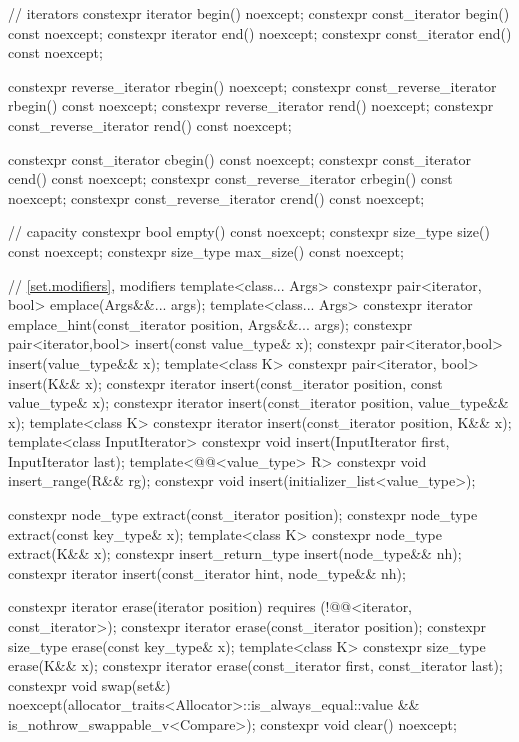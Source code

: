 \begin{codeblock}
{{    // iterators
    constexpr iterator               begin() noexcept;
    constexpr const_iterator         begin() const noexcept;
    constexpr iterator               end() noexcept;
    constexpr const_iterator         end() const noexcept;

    constexpr reverse_iterator       rbegin() noexcept;
    constexpr const_reverse_iterator rbegin() const noexcept;
    constexpr reverse_iterator       rend() noexcept;
    constexpr const_reverse_iterator rend() const noexcept;

    constexpr const_iterator         cbegin() const noexcept;
    constexpr const_iterator         cend() const noexcept;
    constexpr const_reverse_iterator crbegin() const noexcept;
    constexpr const_reverse_iterator crend() const noexcept;

    // capacity
    constexpr bool empty() const noexcept;
    constexpr size_type size() const noexcept;
    constexpr size_type max_size() const noexcept;

    // \ref{set.modifiers}, modifiers
    template<class... Args> constexpr pair<iterator, bool> emplace(Args&&... args);
    template<class... Args>
      constexpr iterator emplace_hint(const_iterator position, Args&&... args);
    constexpr pair<iterator,bool> insert(const value_type& x);
    constexpr pair<iterator,bool> insert(value_type&& x);
    template<class K> constexpr pair<iterator, bool> insert(K&& x);
    constexpr iterator insert(const_iterator position, const value_type& x);
    constexpr iterator insert(const_iterator position, value_type&& x);
    template<class K> constexpr iterator insert(const_iterator position, K&& x);
    template<class InputIterator>
      constexpr void insert(InputIterator first, InputIterator last);
    template<@@<value_type> R>
      constexpr void insert_range(R&& rg);
    constexpr void insert(initializer_list<value_type>);

    constexpr node_type extract(const_iterator position);
    constexpr node_type extract(const key_type& x);
    template<class K> constexpr node_type extract(K&& x);
    constexpr insert_return_type insert(node_type&& nh);
    constexpr iterator           insert(const_iterator hint, node_type&& nh);

    constexpr iterator  erase(iterator position)
      requires (!@@<iterator, const_iterator>);
    constexpr iterator  erase(const_iterator position);
    constexpr size_type erase(const key_type& x);
    template<class K> constexpr size_type erase(K&& x);
    constexpr iterator  erase(const_iterator first, const_iterator last);
    constexpr void      swap(set&)
      noexcept(allocator_traits<Allocator>::is_always_equal::value &&
               is_nothrow_swappable_v<Compare>);
    constexpr void      clear() noexcept;

}}
\end{codeblock}
